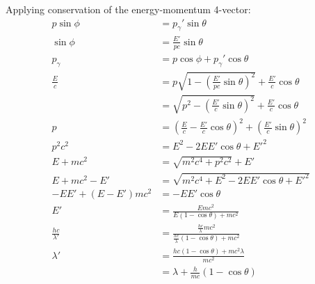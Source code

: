\documentclass{article}
\begin{document}
Applying conservation of the energy-momentum 4-vector:
\begin{equation}
    \begin{split}
        p\sin\phi & = p_\gamma'\sin\theta \\
        \sin\phi & = \frac{E'}{pc}\sin\theta \\
        p_\gamma & = p\cos\phi + p_\gamma'\cos\theta \\
        \frac{E}{c} & = p\sqrt{1 - (\frac{E'}{pc}\sin\theta)^2} + \frac{E'}{c}\cos\theta \\
        & = \sqrt{p^2 - (\frac{E'}{c}\sin\theta)^2} + \frac{E'}{c}\cos\theta \\
        p & = (\frac{E}{c} - \frac{E'}{c}\cos\theta)^2 + (\frac{E'}{c}\sin\theta)^2 \\
        p^2c^2 & = E^2 - 2EE'\cos\theta + E'^2 \\
        E + mc^2 & = \sqrt{m^2c^4 + p^2c^2} + E' \\
        E + mc^2 - E' & = \sqrt{m^2c^4 + E^2 - 2EE'\cos\theta + E'^2} \\
        -EE' + (E - E')mc^2 & = -EE'\cos\theta \\
        E' & = \frac{Emc^2}{E(1 - \cos\theta) + mc^2} \\
        \frac{hc}{\lambda'} & = \frac{\frac{hc}{\lambda}mc^2}{\frac{hc}{\lambda}(1 - \cos\theta) + mc^2} \\
        \lambda' & = \frac{hc(1 - \cos\theta) + mc^2\lambda}{mc^2} \\
        & = \lambda + \frac{h}{mc}(1 - \cos\theta)
    \end{split}
\end{equation}
\end{document}
